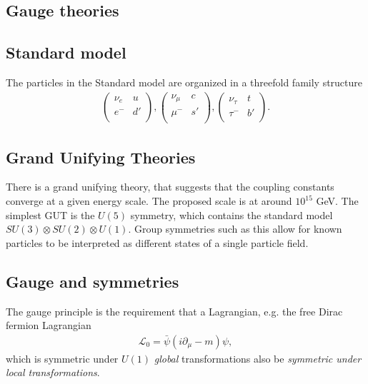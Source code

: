 \documentclass[11pt]{article}
\begin{document}
\begin{multicols}{2}
\section{Gauge theories}

\subsection*{Standard model}
\begin{flushleft}
The particles in the Standard model are organized in a threefold family structure
\begin{align*}
\begin{pmatrix}
\nu_e & u\\
e^- & d'\\
\end{pmatrix}, 
\begin{pmatrix}
\nu_{\mu} & c\\
\mu^- & s'\\
\end{pmatrix},
\begin{pmatrix}
\nu_{\tau} & t\\
\tau^- & b'\\
\end{pmatrix}.
\end{align*}
\end{flushleft}

\subsection*{Grand Unifying Theories}
\begin{flushleft}
There is a grand unifying theory, that suggests that the coupling constants converge at a given energy scale. The proposed scale is at around $10^{15}$ GeV. The simplest GUT is the $U(5)$ symmetry, which contains the standard model $SU(3) \otimes SU(2) \otimes U(1)$. Group symmetries such as this allow for known particles to be interpreted as different states of a single particle field.
\end{flushleft}

\subsection*{Gauge and symmetries}

\begin{flushleft}
The gauge principle is the requirement that a Lagrangian, e.g. the free Dirac fermion Lagrangian
\begin{align*}
\mathcal{L}_0 = \bar{\psi}(i \partial_{\mu} - m) \psi,
\end{align*}
which is symmetric under $U(1)$ \textit{global} transformations also be \textit{symmetric under local transformations}.
\end{flushleft}


\end{multicols}
\end{document}
